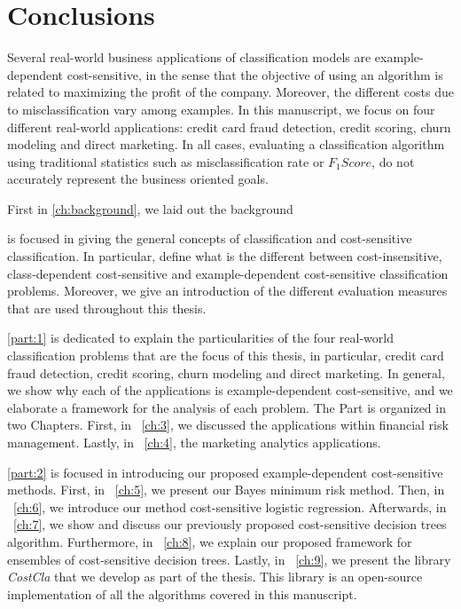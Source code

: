 \chapter{Conclusions}\label{ch:10}

Several real-world business applications of classification models are example-dependent 
cost-sensitive, in the sense that the objective of using an algorithm is related to maximizing the 
profit of the company. Moreover, the different costs due to misclassification vary among examples. 
In this manuscript, we focus on four different real-world applications: credit card fraud 
detection, credit scoring, churn modeling and direct marketing. In all cases, evaluating a 
classification algorithm using traditional statistics such as misclassification rate or $F_1Score$, 
do not accurately represent the business oriented goals.

First in \chaptername{ \ref{ch:background}}, we laid out the background

is focused in giving the general concepts of classification 
and cost-sensitive classification. In particular, define what is the different between 
cost-insensitive, class-dependent cost-sensitive and example-dependent cost-sensitive 
classification problems. Moreover, we give an introduction of the different evaluation measures 
that are used throughout this thesis.

\partname{ \ref{part:1}} is dedicated to explain the particularities of the four real-world 
classification problems that are the focus of this thesis, in particular, credit card fraud 
detection, credit scoring, churn modeling and direct marketing. In general, we show why each of the 
applications is example-dependent cost-sensitive, and we elaborate a framework for the analysis of 
each problem. The Part is organized in two Chapters. First, in \chaptername{~\ref{ch:3}}, we 
discussed the applications within financial risk management. Lastly, in  
\chaptername{~\ref{ch:4}}, the marketing analytics applications.

\partname{ \ref{part:2}} is focused in introducing our proposed example-dependent cost-sensitive 
methods. First, in \chaptername{~\ref{ch:5}}, we present our Bayes minimum risk method. Then, in 
\chaptername{~\ref{ch:6}}, we introduce our method cost-sensitive logistic regression. Afterwards, 
in \chaptername{~\ref{ch:7}}, we show and discuss our previously proposed cost-sensitive decision 
trees algorithm. Furthermore, in \chaptername{~\ref{ch:8}}, we explain our proposed framework for 
ensembles of cost-sensitive decision trees. Lastly, in \chaptername{~\ref{ch:9}}, we present the 
library \mbox{\textit{CostCla}} that we develop as part of the thesis. This library is an 
open-source implementation of all the algorithms covered in this manuscript.

